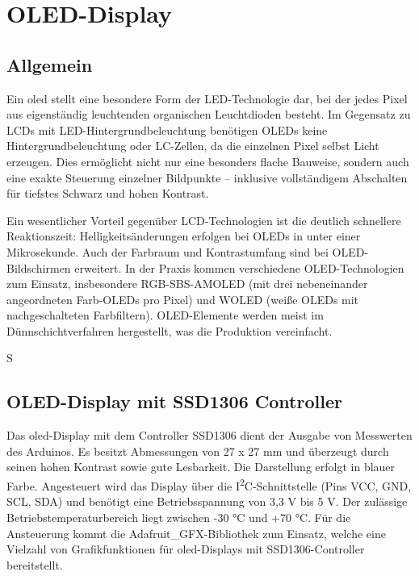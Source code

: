 %
%

\chapter{OLED-Display}\label{sec:OLEDDisplay}
\section{Allgemein}
Ein \ac{oled} stellt eine besondere Form der LED-Technologie dar, bei der jedes Pixel aus eigenständig leuchtenden organischen Leuchtdioden besteht. Im Gegensatz zu LCDs mit LED-Hintergrundbeleuchtung benötigen OLEDs keine Hintergrundbeleuchtung oder LC-Zellen, da die einzelnen Pixel selbst Licht erzeugen. Dies ermöglicht nicht nur eine besonders flache Bauweise, sondern auch eine exakte Steuerung einzelner Bildpunkte – inklusive vollständigem Abschalten für tiefstes Schwarz und hohen Kontrast.

Ein wesentlicher Vorteil gegenüber LCD-Technologien ist die deutlich schnellere Reaktionszeit: Helligkeitsänderungen erfolgen bei OLEDs in unter einer Mikrosekunde. Auch der Farbraum und Kontrastumfang sind bei OLED-Bildschirmen erweitert.
In der Praxis kommen verschiedene OLED-Technologien zum Einsatz, insbesondere RGB-SBS-AMOLED (mit drei nebeneinander angeordneten Farb-OLEDs pro Pixel) und WOLED (weiße OLEDs mit nachgeschalteten Farbfiltern). OLED-Elemente werden meist im Dünnschichtverfahren hergestellt, was die Produktion vereinfacht.\cite{Stotz:2019}



S\section{OLED-Display mit SSD1306 Controller}
Das \ac{oled}-Display mit dem Controller SSD1306 dient der Ausgabe von Messwerten des Arduinos. Es besitzt Abmessungen von 27 x 27 mm und überzeugt durch seinen hohen Kontrast sowie gute Lesbarkeit. Die Darstellung erfolgt in blauer Farbe. Angesteuert wird das Display über die I\textsuperscript{2}C-Schnittstelle (Pins VCC, GND, SCL, SDA) und benötigt eine Betriebsspannung von 3,3 V bis 5 V. Der zulässige Betriebstemperaturbereich liegt zwischen -30 °C und +70 °C. Für die Ansteuerung kommt die Adafruit\_GFX-Bibliothek zum Einsatz, welche eine Vielzahl von Grafikfunktionen für \ac{oled}-Displays mit SSD1306-Controller bereitstellt.\cite{Velleman:WPI438}

